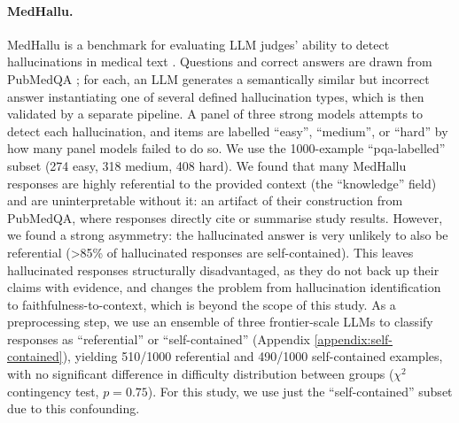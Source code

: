 \documentclass{article}
\begin{document}
\paragraph{MedHallu.} MedHallu is a benchmark for evaluating LLM judges' ability to detect hallucinations in medical text \citep{pandit_medhallu_2025}. Questions and correct answers are drawn from PubMedQA \citep{jin2019pubmedqadatasetbiomedicalresearch}; for each, an LLM generates a semantically similar but incorrect answer instantiating one of several defined hallucination types, which is then validated by a separate pipeline. A panel of three strong models attempts to detect each hallucination, and items are labelled ``easy'', ``medium'', or ``hard'' by how many panel models failed to do so. We use the 1000-example ``pqa-labelled'' subset (274 easy, 318 medium, 408 hard). We found that many MedHallu responses are highly referential to the provided context (the ``knowledge'' field) and are uninterpretable without it: an artifact of their construction from PubMedQA, where responses directly cite or summarise study results. However, we found a strong asymmetry: the hallucinated answer is very unlikely to also be referential (>85\% of hallucinated responses are self-contained). This leaves hallucinated responses structurally disadvantaged, as they do not back up their claims with evidence, and changes the problem from hallucination identification to faithfulness-to-context, which is beyond the scope of this study. As a preprocessing step, we use an ensemble of three frontier-scale LLMs to classify responses as ``referential'' or ``self-contained'' (Appendix \ref{appendix:self-contained}), yielding 510/1000 referential and 490/1000 self-contained examples, with no significant difference in difficulty distribution between groups ($\chi^2$ contingency test, $p=0.75$). For this study, we use just the ``self-contained'' subset due to this confounding.
\end{document}

